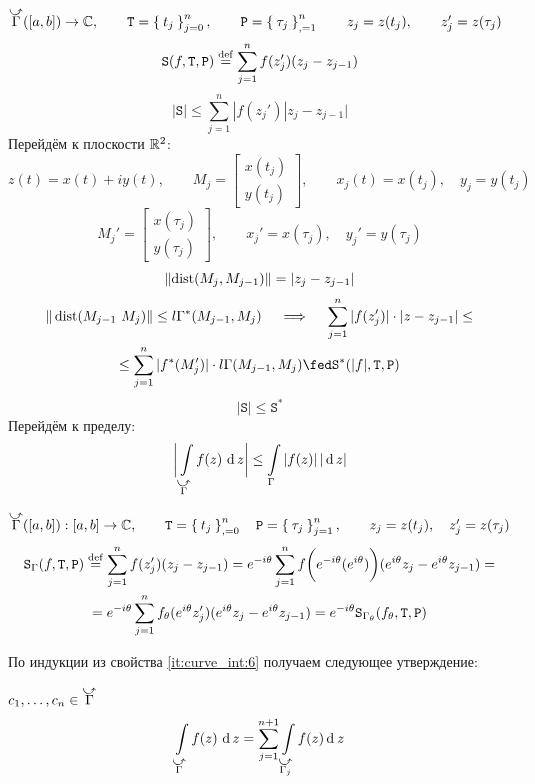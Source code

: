 \begin{eproof}
	\item $ \curvedir\Gamma ([a, b]) \to \Co, \qquad \mathtt T = \seqz[n]{t_j}j, \qquad \mathtt P = \seq[n]{\tau_j}, \qquad z_j = z(t_j), \qquad z_j' = z(\tau_j) $
		$$ \mathtt S (f, \mathtt T, \mathtt P) \stackrel{\operatorname{def}}{=} \sum_{j = 1}^n f(z_j')(z_j - z_{j - 1}) $$
		$$ |\mathtt S| \le \sum_{j = 1}^n |f(z_j') |z_j - z_{j - 1}| $$
		Перейдём к плоскости $ \mathbb{R}^2 $:
		$$ z(t) = x(t) + iy(t), \qquad M_j =
		\begin{bmatrix}
			x(t_j) \\
			y(t_j)
		\end{bmatrix}, \qquad x_j(t) = x(t_j), \quad y_j = y(t_j) $$
		$$ M_j' =
		\begin{bmatrix}
			x(\tau_j) \\
			y(\tau_j)
		\end{bmatrix}, \qquad x_j' = x(\tau_j), \quad y_j' = y(\tau_j) $$
		$$ \left\|{\operatorname{dist}(M_j, M_{j - 1})}\right\| = |z_j - z_{j - 1}| $$
		\begin{multline*}
			\| \dist(M_{j - 1} ~ M_{j}) \| \le l \Gamma^*(M_{j - 1}, M_j) \quad \implies \quad \sum_{j = 1}^n |f(z_j')| \cdot |z - z_{j - 1}| \le \\
			\le \sum_{j = 1}^n |f^*(M_j')| \cdot l \Gamma(M_{j - 1}, M_j) \fed \mathtt S^*(|f|, \mathtt T, \mathtt P)
		\end{multline*}
		$$ |\mathtt S| \le \mathtt S^* $$
		Перейдём к пределу:
		$$ \bigg| \cint[z]{\curvedir\Gamma}{f(z)} \bigg| \le \acint\Gamma{|f(z)|} $$

	\item $ \curvedir\Gamma ([a, b]) : [a, b] \to \Co, \qquad \mathtt T = \seqz[n]{t_j}, \quad \mathtt P = \seq[n]{\tau_j}j, \qquad z_j = z(t_j), \quad z_j' = z(\tau_j) $
		\begin{multline*}
			\mathtt S_\Gamma(f, \mathtt T, \mathtt P) \stackrel{\operatorname{def}}{=} \sum_{j = 1}^n f(z_j')(z_j - z_{j - 1}) = e^{-i\theta} \sum_{j = 1}^n f \bigg( e^{-i\theta}(e^{i\theta}) \bigg) (e^{i\theta}z_j - e^{i\theta}z_{j - 1}) = \\
			= e^{-i\theta} \sum_{j = 1}^n f_\theta(e^{i\theta}z_j')(e^{i\theta}z_j - e^{i\theta}z_{j - 1}) = e^{-i\theta} \mathtt S_{\Gamma_\theta}(f_\theta, \mathtt T, \mathtt P)
		\end{multline*}
\end{eproof}

По индукции из свойства \ref{it:curve_int:6} получаем следующее утверждение:

\begin{property}
	$ c_1, \dots, c_n \in \curvedir\Gamma $
	$$ \cint[z]{\curvedir\Gamma}{f(z)} = \sum_{j = 1}^{n + 1} \int\limits_{\curvedir{\Gamma_j}} f(z) \di z $$
\end{property}

